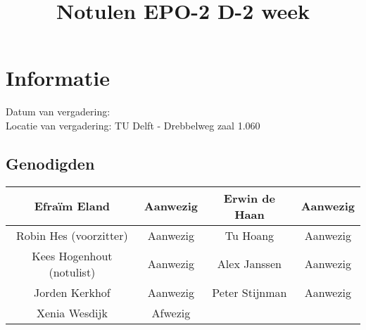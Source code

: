 \documentclass{article}
\begin{document}
\title{Notulen EPO-2 D-2 week }%
\author{}%
\maketitle

\section*{Informatie}
Datum van vergadering: \\ %
Locatie van vergadering: TU Delft - Drebbelweg zaal 1.060 %
\subsection*{Genodigden}
\begin{center}
\begin{tabular}{|c |c | c| c|}
	\hline
Efraïm Eland & Aanwezig & Erwin de Haan & Aanwezig \\
	\hline
Robin Hes (voorzitter) & Aanwezig & Tu Hoang & Aanwezig \\
	\hline
Kees Hogenhout (notulist) & Aanwezig & Alex Janssen & Aanwezig\\
	\hline
Jorden Kerkhof & Aanwezig & Peter Stijnman & Aanwezig \\
	\hline
Xenia Wesdijk & Afwezig & & \\
	\hline
\end{tabular}
\end{center}
\end{document}
